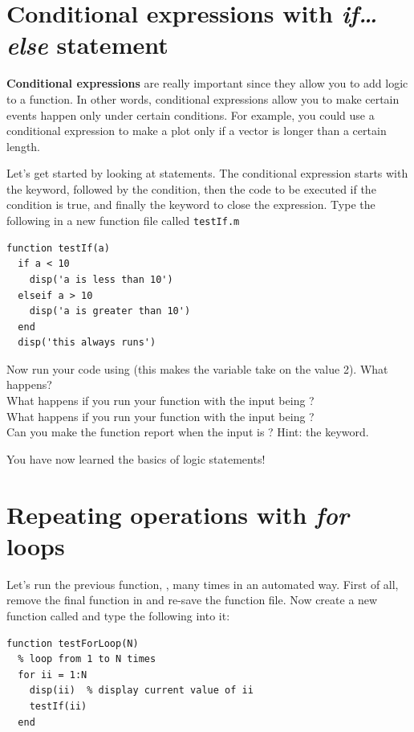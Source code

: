 \documentclass{article}
\begin{document}
\pagebreak
\section{Conditional expressions with \emph{if\dots else} statement}

\textbf{Conditional expressions} are really important since they allow you to add logic to a function.
In other words, conditional expressions allow you to make certain events happen only under certain conditions.
For example, you could use a conditional expression to make a plot only if a vector is longer than a certain length.

Let's get started by looking at  statements.
The conditional expression starts with the  keyword, followed by the condition, then the code to be executed if the condition is true, and finally the  keyword to close the expression.
Type the following in a new function file called \texttt{testIf.m}
\begin{lstlisting}
function testIf(a)
  if a < 10
    disp('a is less than 10')
  elseif a > 10
  	disp('a is greater than 10')
  end
  disp('this always runs')
\end{lstlisting}

Now run your code using  (this makes the variable  take on the value 2).
What happens? \\
What happens if you run your function with the input being ?\\
What happens if you run your function with the input being ?\\
Can you make the function report when the input is ? Hint: the  keyword.

You have now learned the basics of logic statements!


\pagebreak
\section{Repeating operations with \emph{for} loops}

Let's run the previous function, , many times in an automated way.
First of all, remove the final  function in  and re-save the function file.
Now create a new function called  and type the following into it:

\begin{lstlisting}
function testForLoop(N)
  % loop from 1 to N times
  for ii = 1:N
    disp(ii)  % display current value of ii
    testIf(ii)
  end

\end{lstlisting}
\end{document}
